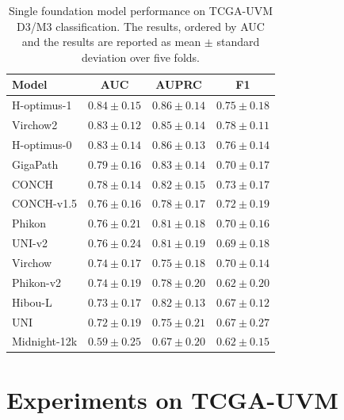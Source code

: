 \begin{table}[!ht]
    \centering
    \caption{Single foundation model performance on TCGA-UVM D3/M3 classification.
    The results, ordered by AUC and the results are reported as mean $\pm$ standard deviation over five folds.}
    \label{tab:uvm_all_fm_performance}
    \begin{tabular}{lccc}
    \toprule
    Model & AUC & AUPRC & F1 \\
    \midrule
    H-optimus-1 &$\mathbf{0.84 \pm 0.15}$ &$0.86 \pm 0.14$ &$0.75 \pm 0.18$ \\
    Virchow2 &$0.83 \pm 0.12$ &$0.85 \pm 0.14$ &$\mathbf{0.78 \pm 0.11}$ \\
    H-optimus-0 &$0.83 \pm 0.14$ &$\mathbf{0.86 \pm 0.13}$ &$0.76 \pm 0.14$ \\
    GigaPath &$0.79 \pm 0.16$ &$0.83 \pm 0.14$ &$0.70 \pm 0.17$ \\
    CONCH &$0.78 \pm 0.14$ &$0.82 \pm 0.15$ &$0.73 \pm 0.17$ \\
    CONCH-v1.5 &$0.76 \pm 0.16$ &$0.78 \pm 0.17$ &$0.72 \pm 0.19$ \\
    Phikon &$0.76 \pm 0.21$ &$0.81 \pm 0.18$ &$0.70 \pm 0.16$ \\
    UNI-v2 &$0.76 \pm 0.24$ &$0.81 \pm 0.19$ &$0.69 \pm 0.18$ \\
    Virchow &$0.74 \pm 0.17$ &$0.75 \pm 0.18$ &$0.70 \pm 0.14$ \\
    Phikon-v2 &$0.74 \pm 0.19$ &$0.78 \pm 0.20$ &$0.62 \pm 0.20$ \\
    Hibou-L &$0.73 \pm 0.17$ &$0.82 \pm 0.13$ &$0.67 \pm 0.12$ \\
    UNI &$0.72 \pm 0.19$ &$0.75 \pm 0.21$ &$0.67 \pm 0.27$ \\
    Midnight-12k &$0.59 \pm 0.25$ &$0.67 \pm 0.20$ &$0.62 \pm 0.15$ \\
    \bottomrule
    \end{tabular}
\end{table}

\clearpage
\section{Experiments on TCGA-UVM}

